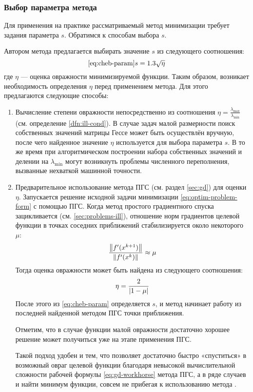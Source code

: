 \subsubsection{Выбор параметра метода}
\label{sec:cheb-param}

Для применения на практике рассматриваемый метод минимизации требует
задания параметра $s$. Обратимся к способам выбора $s$.

Автором метода предлагается выбирать значение $s$ из следующего
соотношения:
\begin{equation}
  \eqref{eq:cheb-param}
  s = 1.3 \sqrt{\eta}
\end{equation}
где $\eta$ — оценка овражности минимизируемой функции. Таким образом,
возникает необходимость определения $\eta$ перед применением метода.
Для этого предлагаются следующие способы:
\begin{enumerate}
\item Вычисление степени овражности непосредственно из соотношения
  $\eta=\frac{\lambda_{\max}}{\lambda_{\min}}$ (см. определение
  \ref{dfn:ill-cond}). В случае задач малой размерности поиск
  собственных значений матрицы Гессе может быть осуществлён вручную,
  после чего найденное значение $\eta$ используется для выбора
  параметра $s$. В то же время при алгоритмическом построении набора
  собственных значений и делении на $\lambda_{\min}$ могут возникнуть
  проблемы численного переполнения, вызванные нехваткой машинной
  точности.
\item Предварительное использование метода ПГС (см. раздел
  \ref{sec:gd}) для оценки $\eta$. Запускается решение исходной задачи
  минимизации \eqref{eq:optim-problem-form} с помощью ПГС. Когда метод
  простого градиентного спуска зацикливается (см.
  \ref{sec:problems-ill}), отношение норм градиентов целевой функции в
  точках соседних приближений стабилизируется около некоторого $\mu$:
  \begin{equation*}
    \frac{\left \lVert{f'(x^{k+1})}\right \rVert}{\left \lVert{f'(x^k)}\right \rVert} \approx \mu
  \end{equation*}
  Тогда оценка овражности может быть найдена из следующего
  соотношения:
  \begin{equation*}
    \eta = \frac{2}{\left \lvert{1-\mu}\right \rvert}
  \end{equation*}
  После этого из \eqref{eq:cheb-param} определяется $s$, и метод
  \relch начинает работу из последней найденной методом ПГС точки
  приближения.

  Отметим, что в случае функции малой овражности достаточно хорошее
  решение может получиться уже на этапе применения ПГС.
  
  Такой подход удобен и тем, что позволяет достаточно быстро
  «спуститься» в возможный овраг целевой функции благодаря невысокой
  вычислительной сложности рабочей формулы \eqref{eq:gd-workhorse}
  метода ПГС, а в ряде случаев и найти минимум функции, совсем не
  прибегая к использованию метода \relch.
\end{enumerate}

